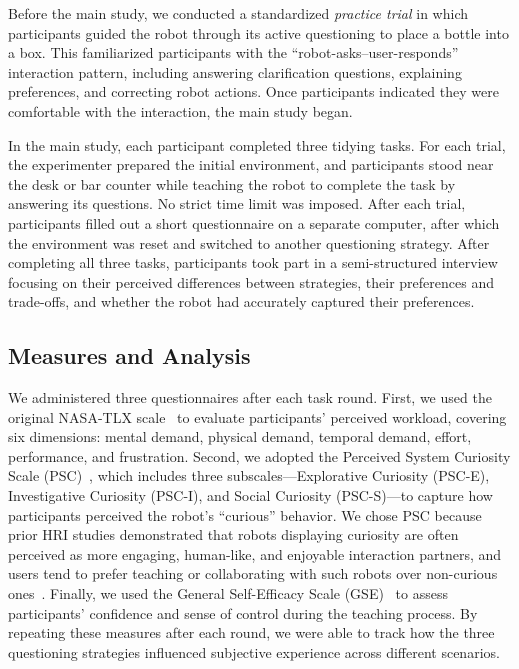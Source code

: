 \documentclass[sigconf,authordraft]{acmart}
\begin{document}
Before the main study, we conducted a standardized \textit{practice trial} in which participants guided the robot through its active questioning to place a bottle into a box. This familiarized participants with the “robot-asks–user-responds” interaction pattern, including answering clarification questions, explaining preferences, and correcting robot actions. Once participants indicated they were comfortable with the interaction, the main study began.  

In the main study, each participant completed three tidying tasks. For each trial, the experimenter prepared the initial environment, and participants stood near the desk or bar counter while teaching the robot to complete the task by answering its questions. No strict time limit was imposed. After each trial, participants filled out a short questionnaire on a separate computer, after which the environment was reset and switched to another questioning strategy. After completing all three tasks, participants took part in a semi-structured interview focusing on their perceived differences between strategies, their preferences and trade-offs, and whether the robot had accurately captured their preferences.


\subsection{Measures and Analysis}
We administered three questionnaires after each task round. First, we used the original NASA-TLX scale~\cite{hart1988development} to evaluate participants’ perceived workload, covering six dimensions: mental demand, physical demand, temporal demand, effort, performance, and frustration. Second, we adopted the Perceived System Curiosity Scale (PSC)~\cite{conf/chi/LeusmannVB0M25}, which includes three subscales—Explorative Curiosity (PSC-E), Investigative Curiosity (PSC-I), and Social Curiosity (PSC-S)—to capture how participants perceived the robot’s “curious” behavior. We chose PSC because prior HRI studies demonstrated that robots displaying curiosity are often perceived as more engaging, human-like, and enjoyable interaction partners, and users tend to prefer teaching or collaborating with such robots over non-curious ones~\cite{8leusmann2025investigating}. Finally, we used the General Self-Efficacy Scale (GSE)~\cite{schwarzer1995generalized} to assess participants’ confidence and sense of control during the teaching process. By repeating these measures after each round, we were able to track how the three questioning strategies influenced subjective experience across different scenarios.
\end{document}
